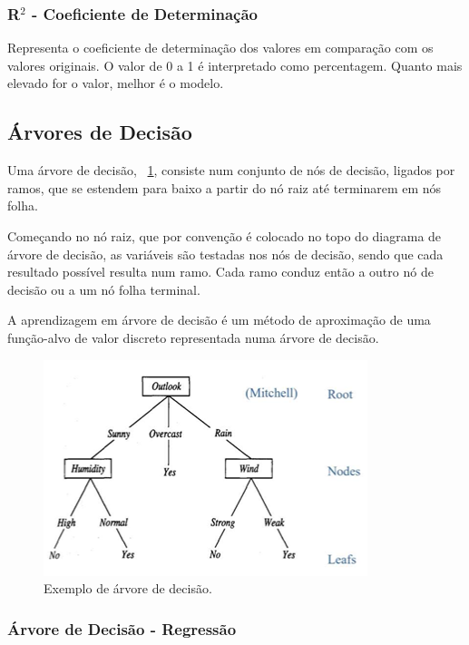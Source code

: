 \documentclass[conference]{IEEEtran}
\begin{document}
\medskip
\subsubsection{R$^2$ - Coeficiente de Determinação}

Representa o coeficiente de determinação dos valores em comparação com os valores originais. O valor de 0 a 1 é interpretado como percentagem. Quanto mais elevado for o valor, melhor é o modelo.\cite{madureira2024cv} 


\subsection{Árvores de Decisão}

Uma árvore de decisão,  \figurename~\ref{fig:Decision_Trees_example},  consiste num conjunto de nós de decisão, ligados por ramos, que se estendem para baixo a partir do nó raiz até terminarem em nós folha. 

Começando no nó raiz, que por convenção é colocado no topo do diagrama de árvore de decisão, as variáveis são testadas nos nós de decisão, sendo que cada resultado possível resulta num ramo. Cada ramo conduz então a outro nó de decisão ou a um nó folha terminal. 

A aprendizagem em árvore de decisão é um método de aproximação de uma função-alvo de valor discreto representada numa árvore de decisão. \cite{madureira2024dt}

\begin{figure}[h]
	\centering
	\includegraphics[width=0.9\linewidth]{Decision_Trees_example}
	\caption{Exemplo de árvore de decisão. \cite{madureira2024dt}}
	\label{fig:Decision_Trees_example}
\end{figure}

\subsubsection{Árvore de Decisão - Regressão}
\end{document}
